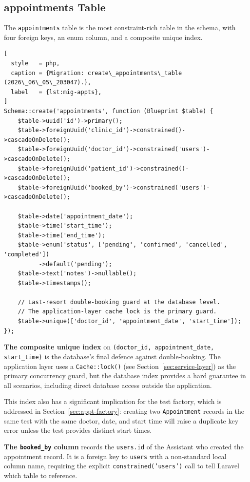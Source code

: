 \subsection{appointments Table}

The \texttt{appointments} table is the most constraint-rich table in
the schema, with four foreign keys, an enum column, and a composite
unique index.

\begin{lstlisting}[
  style   = php,
  caption = {Migration: create\_appointments\_table (2026\_06\_05\_203047).},
  label   = {lst:mig-appts},
]
Schema::create('appointments', function (Blueprint $table) {
    $table->uuid('id')->primary();
    $table->foreignUuid('clinic_id')->constrained()->cascadeOnDelete();
    $table->foreignUuid('doctor_id')->constrained('users')->cascadeOnDelete();
    $table->foreignUuid('patient_id')->constrained()->cascadeOnDelete();
    $table->foreignUuid('booked_by')->constrained('users')->cascadeOnDelete();

    $table->date('appointment_date');
    $table->time('start_time');
    $table->time('end_time');
    $table->enum('status', ['pending', 'confirmed', 'cancelled', 'completed'])
          ->default('pending');
    $table->text('notes')->nullable();
    $table->timestamps();

    // Last-resort double-booking guard at the database level.
    // The application-layer cache lock is the primary guard.
    $table->unique(['doctor_id', 'appointment_date', 'start_time']);
});
\end{lstlisting}

\textbf{The composite unique index} on
\texttt{(doctor\_id, appointment\_date, start\_time)} is the database's
final defence against double-booking. The application layer uses a
\texttt{Cache::lock()} (see Section~\ref{sec:service-layer}) as the
primary concurrency guard, but the database index provides a hard
guarantee in all scenarios, including direct database access outside
the application.

This index also has a significant implication for the test factory,
which is addressed in Section~\ref{sec:appt-factory}: creating two
\texttt{Appointment} records in the same test with the same doctor, date,
and start time will raise a duplicate key error unless the test provides
distinct start times.

\textbf{The \texttt{booked\_by} column} records the \texttt{users.id}
of the Assistant who created the appointment record. It is a foreign key
to \texttt{users} with a non-standard local column name, requiring the
explicit \texttt{constrained('users')} call to tell Laravel which table
to reference.

